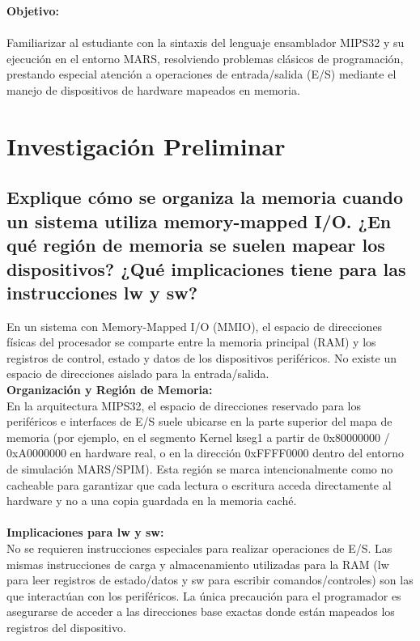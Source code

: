 \documentclass[12pt, a4paper]{article}
\begin{document}

\newpage
\textbf{\large Objetivo:}\\\\
    Familiarizar al estudiante con la sintaxis del lenguaje ensamblador MIPS32 y su ejecución en el entorno MARS, resolviendo problemas clásicos de programación, prestando especial atención a operaciones de entrada/salida (E/S) mediante el manejo de dispositivos de hardware mapeados en memoria.\\

\section{Investigación Preliminar}

\subsection{Explique cómo se organiza la memoria cuando un sistema utiliza memory-mapped I/O. ¿En qué región de memoria se suelen mapear los dispositivos? ¿Qué implicaciones tiene para las instrucciones lw y sw?}
    En un sistema con Memory-Mapped I/O (MMIO), el espacio de direcciones físicas del procesador se comparte entre la memoria principal (RAM) y los registros de control, estado y datos de los dispositivos periféricos. No existe un espacio de direcciones aislado para la entrada/salida.\\
    \textbf{Organización y Región de Memoria:}\\
    En la arquitectura MIPS32, el espacio de direcciones reservado para los periféricos e interfaces de E/S suele ubicarse en la parte superior del mapa de memoria (por ejemplo, en el segmento Kernel kseg1 a partir de 0x80000000 / 0xA0000000 en hardware real, o en la dirección 0xFFFF0000 dentro del entorno de simulación MARS/SPIM). Esta región se marca intencionalmente como no cacheable para garantizar que cada lectura o escritura acceda directamente al hardware y no a una copia guardada en la memoria caché.\\\\
    \textbf{Implicaciones para lw y sw:}\\No se requieren instrucciones especiales para realizar operaciones de E/S. Las mismas instrucciones de carga y almacenamiento utilizadas para la RAM (lw para leer registros de estado/datos y sw para escribir comandos/controles) son las que interactúan con los periféricos. La única precaución para el programador es asegurarse de acceder a las direcciones base exactas donde están mapeados los registros del dispositivo.
\end{document}
